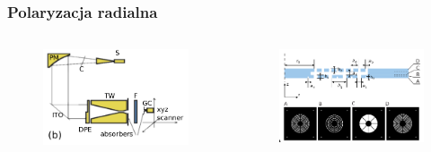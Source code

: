 \documentclass{beamer}
\begin{document}
\begin{frame}
	\frametitle{Polaryzacja radialna}
	\begin{columns}
		\begin{column}{0.5\textwidth}
			\begin{figure}
				\includegraphics[width=\textwidth]{../images/dmg/express_exp_setu.png}\\
			\end{figure}
		\end{column}
		\begin{column}{0.5\textwidth}
			\begin{figure}
				\includegraphics[width=\textwidth]{../images/dmg/express_siatki.png}\\
			\end{figure}
		\end{column}
	\end{columns}
	\cite{Yavorskiy:14}
		
\end{frame}
\end{document}
